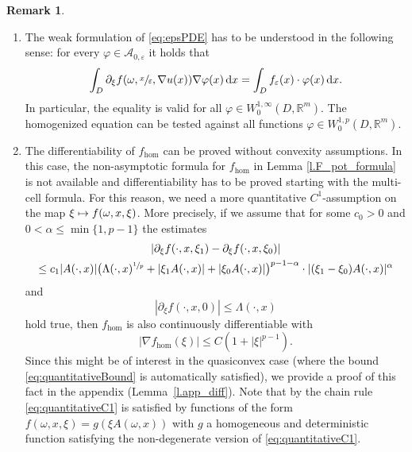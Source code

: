 \documentclass[JEP,XML,SOM,Unicode,published]{cedram}
\newenvironment{enumeratea}
{\bgroup\def\theenumi{\alph{enumi}}\begin{enumerate}}
{\end{enumerate}\egroup}
\def\mto{\mathchoice{\longmapsto}{\mapsto}{\mapsto}{\mapsto}}
\theoremstyle{definition}
\newtheorem{remark}[theorem]{Remark}
\let\e\varepsilon
\let\w\omega
\newcommand{\dx}{\,\mathrm{d}x}
\newcommand{\R}{\mathbb{R}}
\begin{document}
\begin{remark}\label{r.weaksol}
\begin{enumeratea}
\item
The weak formulation of \eqref{eq:epsPDE} has to be understood in the following sense: for every $\varphi\in\mathcal{A}_{0,\e}$ it holds that
\begin{equation*}
\int_D \partial_{\xi}f(\w,\sfrac{x}{\e},\nabla u(x)) \nabla\varphi(x)\dx=\int_D f_{\e}(x)\cdot\varphi(x)\dx.
\end{equation*}
In particular, the equality is valid for all $\varphi\in W^{1,\infty}_0(D,\R^m)$. The homogenized equation can be tested against all functions $\varphi\in W^{1,p}_0(D,\R^m)$.

\item
The differentiability of $f_{\hom}$ can be proved without convexity assumptions. In this case, the non-asymptotic formula for $f_{\hom}$ in Lemma \ref{l.F_pot_formula} is not available and differentiability has to be proved starting with the multi-cell formula. For this reason, we need a more quantitative $C^1$-assumption on the map $\xi\mto f(\w,x,\xi)$. More precisely, if we assume that for some $c_0>0$ and $0<\alpha\leq\min\{1,p-1\}$ the estimates
\begin{multline}\label{eq:quantitativeC1}
| \partial_{\xi}f(\cdot,x,\xi_1)-\partial_{\xi}f(\cdot,x,\xi_0)|\\
\leq c_1|A(\cdot,x)|\bigl(\Lambda(\cdot,x)^{\sfrac{1}{p}}+|\xi_1A(\cdot,x)|+|\xi_0A(\cdot,x)|\bigr)^{p-1-\alpha}
\cdot|(\xi_1-\xi_0)A(\cdot,x)|^{\alpha}
\end{multline}
and
\begin{equation}\label{eq:quantitativeBound}
|\partial_{\xi}f(\cdot,x,0)|\leq\Lambda(\cdot,x)
\end{equation}
hold true, then $f_{\hom}$ is also continuously differentiable with
\[
|\nabla f_{\hom}(\xi)|\leq C(1+|\xi|^{p-1}).
\]
Since this might be of interest in the quasiconvex case (where the bound \eqref{eq:quantitativeBound} is automatically satisfied), we provide a proof of this fact in the appendix (\cf Lemma~\ref{l.app_diff}). Note that by the chain rule \eqref{eq:quantitativeC1} is satisfied by functions of the form $f(\w,x,\xi)=g(\xi A(\w,x))$ with $g$ a homogeneous and deterministic function satisfying the non-degenerate version of \eqref{eq:quantitativeC1}.


\end{enumeratea}
\end{remark}
\end{document}
